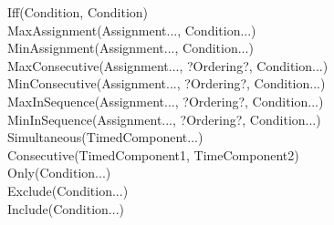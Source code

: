 \begin{description}
\item[Iff(Condition, Condition)]	
	
\item[MaxAssignment(Assignment..., Condition...)]	
	
\item[MinAssignment(Assignment..., Condition...)]		
	
\item[MaxConsecutive(Assignment..., ?Ordering?, Condition...)]	
		
\item[MinConsecutive(Assignment..., ?Ordering?, Condition...)]	
		
\item[MaxInSequence(Assignment..., ?Ordering?, Condition...)]	
		
\item[MinInSequence(Assignment..., ?Ordering?, Condition...)]			
	
\item[Simultaneous(TimedComponent...)]	
	
\item[Consecutive(TimedComponent1, TimeComponent2)]	
	
\item[Only(Condition...)]	
	 
\item[Exclude(Condition...)]	
	
\item[Include(Condition...)]	
	 
\end{description}